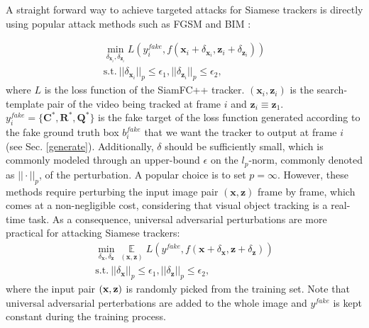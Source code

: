 \documentclass[journal]{IEEEtran}
\begin{document}
A straight forward way to achieve targeted attacks for Siamese trackers is directly using popular attack methods such as FGSM \cite{FGSM} and BIM \cite{DBLP:conf/iclr/KurakinGB17a}:

\begin{equation}
\begin{gathered}
  \min\limits_{\delta_{\textbf{x}_{i}}, \delta_{\textbf{z}_{i}}} L(y^{fake}_i, f(\textbf{x}_i + \delta_{\textbf{x}_{i}}, \textbf{z}_i + \delta_{\textbf{z}_{i}}))\\
  \text{s.t.}\ ||\delta_{\textbf{x}_i}||_p \le \epsilon_1, ||\delta_{\textbf{z}_i}||_p \le \epsilon_2,
\end{gathered}
\end{equation}
where $L$ is the loss function of the SiamFC++ tracker. $(\textbf{x}_i, \textbf{z}_i)$ is the search-template pair of the video being tracked at frame $i$ and $\textbf{z}_i \equiv \textbf{z}_1$. $y^{fake}_i=\{\textbf{C}^*, \textbf{R}^*, \textbf{Q}^*\}$ is the fake target of the loss function generated according to the fake ground truth box $b^{fake}_i$ that we want the tracker to output at frame $i$ (see Sec. \ref{generate}). 
Additionally, $\delta$ should be sufficiently small, which is commonly modeled through an upper-bound $\epsilon$ on the $l_p\text{-norm}$, commonly denoted as $||\cdot||_p$, of the perturbation. A popular choice is to set $p=\infty$.
However, these methods require perturbing the input image pair $(\textbf{x}, \textbf{z})$ frame by frame, which comes at a non-negligible cost, considering that visual object tracking is a real-time task.
As a consequence, universal adversarial perturbations \cite{UAP, shafahi2020universal} are more practical for attacking Siamese trackers:
\begin{equation}
  \begin{gathered}
    \min\limits_{\delta_\textbf{x}, \delta_\textbf{z}} \mathop{\mathbb{E}}\limits_{(\textbf{x}, \textbf{z})} L(y^{fake}, f(\textbf{x} + \delta_\textbf{x}, \textbf{z} + \delta_\textbf{z}))\\
    \text{s.t.}\ ||\delta_\textbf{x}||_p \le \epsilon_1, ||\delta_\textbf{z}||_p \le \epsilon_2,
  \end{gathered}
\end{equation}  
where the input pair $(\textbf x,\textbf z)$ is randomly picked from the training set. 
Note that universal adversarial perterbations are added to the whole image and $y^{fake}$ is kept constant during the training process.
\end{document}
